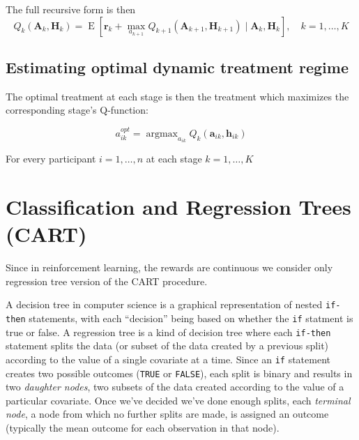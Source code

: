 \documentclass[12pt]{article}
\DeclareMathOperator*{\argmax}{argmax}
\begin{document}
The full recursive form is then 
  \begin{equation}
     Q_{k}(\bm{A}_{k}, \bm{H}_{k})  = \operatorname{E}[\bm{r}_{k} + \max_{a_{k+1}} Q_{k+1}(\bm{A}_{k+1}, \bm{H}_{k+1}) \mid \bm{A}_{k}, \bm{H}_{k}], \quad k = 1, \ldots, K
  \end{equation}



\subsection{Estimating optimal dynamic treatment regime} %
\label{sub:estimating_optimal_dynamic_treatment_regime}

The optimal treatment at each stage is then the treatment which maximizes the corresponding stage's Q-function:

\begin{equation}
  a^{opt}_{ik} = \argmax_{a_{ik}} Q_{k}(\bm{a}_{ik}, \bm{h}_{ik})
\end{equation}

For every participant $i = 1, \ldots, n$ at each stage $k = 1, \ldots, K$






\section{Classification and Regression Trees (CART)} %
\label{sec:rpart}

Since in reinforcement learning, the rewards are continuous we consider only regression tree version of the CART procedure.

A decision tree in computer science is a graphical representation of nested \texttt{if-then} statements, with each ``decision'' being based on whether the \texttt{if} statment is true or false. A regression tree is a kind of decision tree where each \texttt{if-then} statement splits the data (or subset of the data created by a previous split) according to the value of a single covariate at a time. Since an \texttt{if} statement creates two possible outcomes (\texttt{TRUE} or \texttt{FALSE}), each split is binary and results in two \emph{daughter nodes}, two subsets of the data created according to the value of a particular covariate. Once we've decided we've done enough splits, each \emph{terminal node}, a node from which no further splits are made, is assigned an outcome (typically the mean outcome for each observation in that node).
\end{document}
